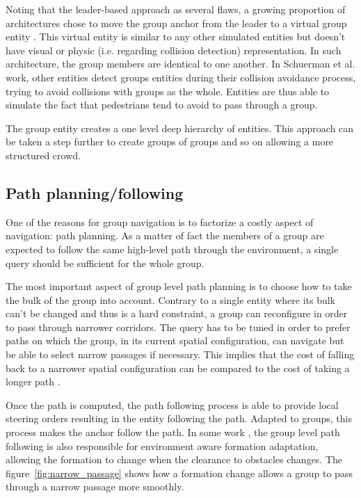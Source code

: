 \documentclass[a4paper,titlepage]{article}
\begin{document}
Noting that the leader-based approach as several flaws, a growing proportion of architectures chose to move the group anchor from the leader to a virtual group entity \cite{Schuerman:2010um,Silveira:2008bc,Karamouzas:2010fi}. This virtual entity is similar to any other simulated entities but doesn’t have visual or physic (i.e. regarding collision detection) representation. In such architecture, the group members are identical to one another. 
In Schuerman et al. \cite{Schuerman:2010um} work, other entities detect groups entities during their collision avoidance process, trying to avoid collisions with groups as the whole. Entities are thus able to simulate the fact that pedestrians tend to avoid to pass through a group.

The group entity creates a one level deep hierarchy of entities. This approach can be taken a step further to create groups of groups and so on \cite{Schuerman:2010um,Millington:2006wz} allowing a more structured crowd.

\subsection{Path planning/following}
\label{sec:who_s_in_charge:path_planning_following}

One of the reasons for group navigation is to factorize a costly aspect of navigation: path planning. As a matter of fact the members of a group are expected to follow the same high-level path through the environment, a single query should be sufficient for the whole group.

The most important aspect of group level path planning is to choose how to take the bulk of the group into account.  Contrary to a single entity where its bulk can’t be changed and thus is a hard constraint, a group can reconfigure in order to pass through narrower corridors. The query has to be tuned in order to prefer paths on which the group, in its current spatial configuration, can navigate but be able to select narrow passages if necessary. This implies that the cost of falling back to a narrower spatial configuration can be compared to the cost of taking a longer path \cite{Kamphuis:2004ct,Pottinger:1999vk,Bayazit:2003up}.

Once the path is computed, the path following process is able to provide local steering orders resulting in the entity following the path. Adapted to groups, this process makes the anchor follow the path. In some work \cite{Bayazit:2003up,Pottinger:1999vk}, the group level path following is also responsible for environment aware formation adaptation, allowing the formation to change when the clearance to obstacles changes. The figure~\ref{fig:narrow_passage} shows how a formation change allows a group to pass through a narrow passage more smoothly.
\end{document}
